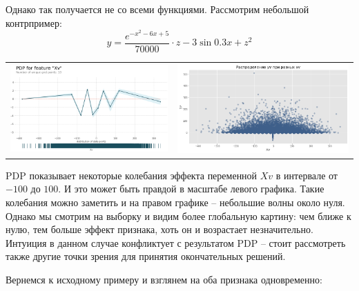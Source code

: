 Однако так получается не со всеми функциями. Рассмотрим небольшой контрпример:
\[
y = \frac{e^{-x^2-6x+5}}{70000} \cdot z - 3 \sin 0.3x + z^2
\]

\noindent
\begin{tabular}{c|c}
	\arrayrulecolor[rgb]{0.8,0.85,1}
	\includegraphics[width=0.46\linewidth]{pics/pdpce.png} & \includegraphics[width=0.5\linewidth]{pics/ce.png} \\
\end{tabular}

PDP показывает некоторые колебания эффекта переменной $Xv$ в интервале от $-100$ до $100$. И это может быть правдой в масштабе левого графика. Такие колебания можно заметить и на правом графике -- небольшие волны около нуля. Однако мы смотрим на выборку и видим более глобальную картину: чем ближе к нулю, тем больше эффект признака, хоть он и возрастает незначительно. Интуиция в данном случае конфликтует с результатом PDP -- стоит рассмотреть также другие точки зрения для принятия окончательных решений.

Вернемся к исходному примеру и взглянем на оба признака одновременно:

